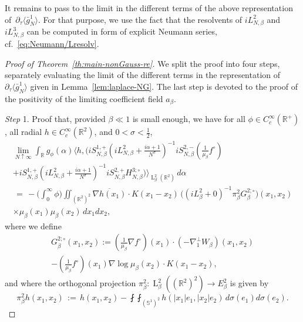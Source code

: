 \documentclass[a4paper,11pt,reqno,noindent]{amsart}
\theoremstyle{plain}
\numberwithin{equation}{section}
\newcommand{\R}{\mathbb R}
\newcommand{\Sp}{\mathbb S}
\newcommand{\3}{|\!|\!|}
\newcommand{\Ld}{\operatorname{L}}
\newcommand{\step}[1]{\noindent \textit{Step} #1.}
\begin{document}
It remains to pass to the limit in the different terms of the above representation of~$\partial_\tau\langle\bar g_N^1\rangle$. For that purpose, we use the fact that the resolvents of $iL_{N,\beta}^2$ and $iL_{N,\beta}^3$ can be computed in form of explicit Neumann series, cf.~\eqref{eq:Neumann/Lresolv}.

\begin{proof}[Proof of Theorem~\ref{th:main-nonGauss-re}]
We split the proof into four steps, separately evaluating the limit of the different terms in the representation of $\partial_\tau\langle\bar g_N^1\rangle$ given in Lemma~\ref{lem:laplace-NG}. The last step is devoted to the proof of the positivity of the limiting coefficient field $a_\beta$.

\medskip
\step1 Proof that, provided $\beta\ll1$ is small enough, we have for all $\phi\in C^\infty_c(\R^+)$, all radial $h\in C^\infty_c(\R^2)$, and $0<\sigma<\frac12$,
\begin{multline}\label{eq:lapl-lim-1st}
\lim_{N\uparrow\infty}\int_\R g_\phi(\alpha)\Big\langle h,\Big(iS_{N,\beta}^{1,+}(iL_{N,\beta}^2+\tfrac{i\alpha+1}{N^\sigma})^{-1}iS_{N,\beta}^{2,-}(\tfrac1{\mu_\beta}f^\circ)\\
+iS_{N,\beta}^{1,+}(iL_{N,\beta}^2+\tfrac{i\alpha+1}{N^\sigma})^{-1}iS_{N,\beta}^{2,+}H_{N,\beta}^{3;\circ}\Big)\Big\rangle_{\Ld^2_\beta(\R^2)}\,d\alpha\\
\,=\,-\Big(\int_0^\infty\phi\Big)\iint_{(\R^2)^2}\overline{\nabla h(x_1)}\cdot K(x_1-x_2)\,\big((iL^2_\beta+0)^{-1}\pi_\beta^2G_{\beta}^{2;\circ}\big)(x_1,x_2)\\
\times\mu_\beta(x_1)\mu_\beta(x_2)\, dx_1dx_2,
\end{multline}
where we define
\begin{multline}\label{eq:def-Gbetainfty}
G_{\beta}^{2;\circ}(x_1,x_2):=
(\tfrac1{\mu_\beta}\nabla f^\circ)(x_1)\cdot(-\nabla^\bot_1W_\beta)(x_1,x_2)\\
-(\tfrac{1}{\mu_\beta}f^\circ)(x_1)\nabla\log\mu_\beta(x_2)\cdot K(x_1-x_2),
\end{multline}
and where the orthogonal projection $\pi_\beta^2:\Ld^2_\beta((\R^2)^2)\to E_\beta^2$ is given by
\[\pi_\beta^2 h(x_1,x_2)\,:=\,h(x_1,x_2)-\fint\!\!\fint_{(\Sp^1)^2}h(|x_1|e_1,|x_2|e_2)\,d\sigma(e_1)d\sigma(e_2).\]


\end{proof}
\end{document}
